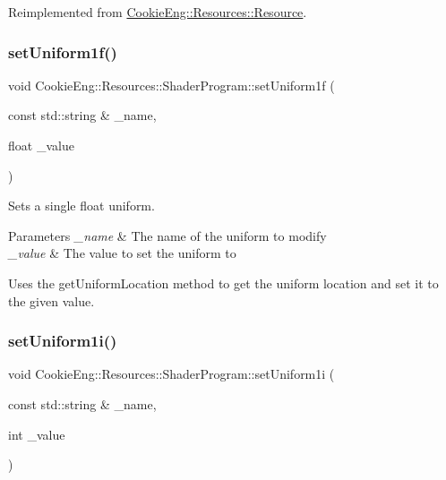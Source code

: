 Reimplemented from \hyperlink{class_cookie_eng_1_1_resources_1_1_resource_a75648b8f2e442bebc90d6eb4ea3a2f6e}{Cookie\+Eng\+::\+Resources\+::\+Resource}.

\mbox{\label{class_cookie_eng_1_1_resources_1_1_shader_program_a6029828eaecc40f6a68779b86f5baf6d}} 
\subsubsection{\texorpdfstring{set\+Uniform1f()}{setUniform1f()}}
{\footnotesize\ttfamily void Cookie\+Eng\+::\+Resources\+::\+Shader\+Program\+::set\+Uniform1f (\begin{DoxyParamCaption}\item[{const std\+::string \&}]{\+\_\+name,  }\item[{float}]{\+\_\+value }\end{DoxyParamCaption})}



Sets a single float uniform. 


\begin{DoxyParams}{Parameters}
{\em \+\_\+name} & The name of the uniform to modify \\
\hline
{\em \+\_\+value} & The value to set the uniform to\\
\hline
\end{DoxyParams}
Uses the get\+Uniform\+Location method to get the uniform location and set it to the given value. \mbox{\label{class_cookie_eng_1_1_resources_1_1_shader_program_a328b09fef2d715e25f9dc3993b060b99}} 
\subsubsection{\texorpdfstring{set\+Uniform1i()}{setUniform1i()}}
{\footnotesize\ttfamily void Cookie\+Eng\+::\+Resources\+::\+Shader\+Program\+::set\+Uniform1i (\begin{DoxyParamCaption}\item[{const std\+::string \&}]{\+\_\+name,  }\item[{int}]{\+\_\+value }\end{DoxyParamCaption})}



